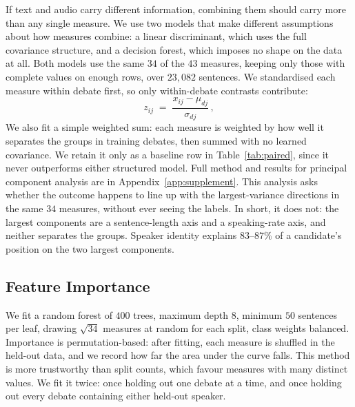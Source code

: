 \documentclass[pdflatex,sn-mathphys-num]{sn-jnl}%
\begin{document}
If text and audio carry different information, combining them should carry
more than any single measure. We use two models that make different
assumptions about how measures combine: a linear discriminant, which uses
the full covariance structure, and a decision forest, which imposes no shape
on the data at all. Both models use the same $34$ of the $43$ measures,
keeping only those with complete values on enough rows, over $23{,}082$
sentences. We standardised each measure within debate first, so only
within-debate contrasts contribute:
\begin{equation}
z_{ij} \;=\; \frac{x_{ij} - \mu_{dj}}{\sigma_{dj}} \,,
\label{eq:zscore}
\end{equation}
We also fit a simple weighted sum: each measure is weighted by how well it
separates the groups in training debates, then summed with no learned
covariance. We retain it only as a baseline row in Table~\ref{tab:paired},
since it never outperforms either structured model. Full method and results
for principal component analysis are in Appendix~\ref{app:supplement}. This
analysis asks whether the outcome happens to line up with the
largest-variance directions in the same $34$ measures, without ever seeing
the labels. In short, it does not: the largest components are a
sentence-length axis and a speaking-rate axis, and neither separates the
groups. Speaker identity explains $83$--$87\%$ of a candidate's position on
the two largest components.

\subsection{Feature Importance}
\label{sec:method:forest}

We fit a random forest of $400$ trees, maximum depth $8$, minimum $50$
sentences per leaf, drawing $\sqrt{34}$ measures at random for each split,
class weights balanced. Importance is permutation-based: after fitting, each
measure is shuffled in the held-out data, and we record how far the area
under the curve falls. This method is more trustworthy than split counts,
which favour measures with many distinct values. We fit it twice: once
holding out one debate at a time, and once holding out every debate
containing either held-out speaker.
\end{document}
